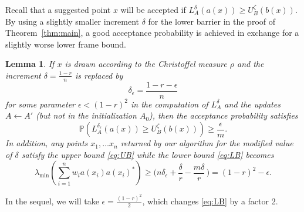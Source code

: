 \documentclass[a4paper,11pt]{article}
\renewcommand{\(}{\left (}
\renewcommand{\)}{\right )}
\newcommand{\<}{\langle}
\renewcommand{\>}{\rangle}
\newcommand{\eps}{\varepsilon}
\newtheorem{lemma}[theorem]{Lemma}
\theoremstyle{definition}
\begin{document}
Recall that a suggested point $x$ will be accepted if $L_A^\delta(a(x)) \ge U_B^\zeta(b(x))$.
By using a slightly smaller increment $\delta$ for the lower barrier in the proof of Theorem~\ref{thm:main}, a good acceptance probability is achieved in exchange for a slightly worse lower frame bound.

\begin{lemma}
\label{lem:accept_proba}
If $x$ is drawn according to the Christoffel measure $\rho$ and the increment $\delta=\frac{1-r}{n}$ is replaced by
\[
\delta_\epsilon=\frac{1-r-\epsilon}{n}
\]
for some parameter $\epsilon < (1-r)^2$ in the computation of $L_A^\delta$ and the updates $A\leftarrow A'$ (but not in the initialization $A_0$),
then the acceptance probability satisfies
\[
\mathbb P\left(L_A^{\delta_\eps}(a(x)) \ge U_B^\zeta(b(x))\right) \ge \frac{\epsilon}{m}.
\]
In addition, any points $x_1,\dots x_n$ returned by our algorithm for the modified value of $\delta$ satisfy the upper bound \eqref{eq:UB} while the lower bound \eqref{eq:LB} becomes
\[
\lambda_{\min}\left(\sum_{i=1}^{n} w_ia(x_i)a(x_i)^*\right)
\geq  \Big(n\delta_\epsilon+\frac{\delta}{r}-\frac{m\delta}{r}\,\Big)= (1-r)^2-\epsilon.
\]
\end{lemma}
In the sequel, we will take $\epsilon=\frac{(1-r)^2}{2}$, which changes \eqref{eq:LB} by a factor 2.
\end{document}
